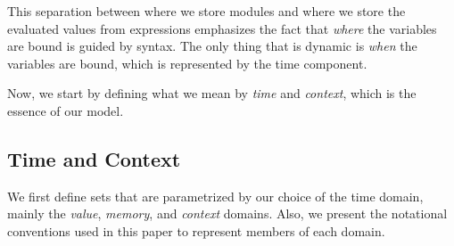 \documentclass[acmsmall,screen,review]{acmart}
\theoremstyle{definition}
\begin{document}
This separation between where we store modules and where we store the evaluated values from expressions emphasizes the fact that \emph{where} the variables are bound is guided by syntax.
The only thing that is dynamic is \emph{when} the variables are bound, which is represented by the time component.

Now, we start by defining what we mean by \emph{time} and \emph{context}, which is the essence of our model.

\subsection{Time and Context}

We first define sets that are parametrized by our choice of the time domain, mainly the \emph{value}, \emph{memory}, and \emph{context} domains.
Also, we present the notational conventions used in this paper to represent members of each domain.
\end{document}
